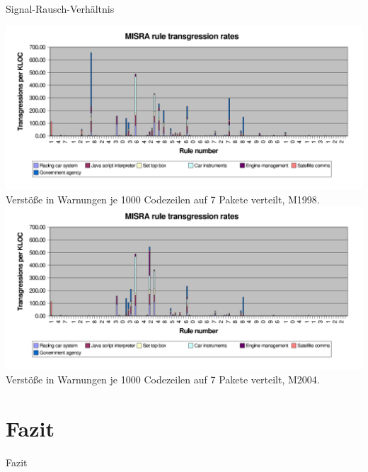 \documentclass{beamer}
\begin{document}

    \begin{frame}{Signal-Rausch-Verhältnis}
        \begin{center}
            \begin{overprint}
                 {
                \includegraphics[width=\textwidth,height=0.8\textheight,keepaspectratio]{graphics/1998-transgression-rates.png}
                Verstöße in Warnungen je 1000 Codezeilen auf 7 Pakete verteilt, M1998.
                }
                 {
                \includegraphics[width=\textwidth,height=0.8\textheight,keepaspectratio]{graphics/2004-transgression-rates.png}
                Verstöße in Warnungen je 1000 Codezeilen auf 7 Pakete verteilt, M2004.
                }
            \end{overprint}
        \end{center}
    \end{frame}

    \section{Fazit}

    \label{sec:fazit}
    \begin{frame}{Fazit}

    \end{frame}
\end{document}
